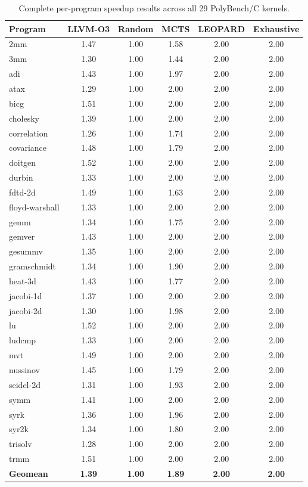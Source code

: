\documentclass{article}
\begin{document}
\begin{table}[h]
\caption{Complete per-program speedup results across all 29 PolyBench/C kernels.}
\label{tab:complete}
\centering
\small
\begin{tabular}{lccccc}
\toprule
\textbf{Program} & \textbf{LLVM-O3} & \textbf{Random} & \textbf{MCTS} & \textbf{LEOPARD} & \textbf{Exhaustive} \\
\midrule
2mm & 1.47 & 1.00 & 1.58 & 2.00 & 2.00 \\
3mm & 1.30 & 1.00 & 1.44 & 2.00 & 2.00 \\
adi & 1.43 & 1.00 & 1.97 & 2.00 & 2.00 \\
atax & 1.29 & 1.00 & 2.00 & 2.00 & 2.00 \\
bicg & 1.51 & 1.00 & 2.00 & 2.00 & 2.00 \\
cholesky & 1.39 & 1.00 & 2.00 & 2.00 & 2.00 \\
correlation & 1.26 & 1.00 & 1.74 & 2.00 & 2.00 \\
covariance & 1.48 & 1.00 & 1.79 & 2.00 & 2.00 \\
doitgen & 1.52 & 1.00 & 2.00 & 2.00 & 2.00 \\
durbin & 1.33 & 1.00 & 2.00 & 2.00 & 2.00 \\
fdtd-2d & 1.49 & 1.00 & 1.63 & 2.00 & 2.00 \\
floyd-warshall & 1.33 & 1.00 & 2.00 & 2.00 & 2.00 \\
gemm & 1.34 & 1.00 & 1.75 & 2.00 & 2.00 \\
gemver & 1.43 & 1.00 & 2.00 & 2.00 & 2.00 \\
gesummv & 1.35 & 1.00 & 2.00 & 2.00 & 2.00 \\
gramschmidt & 1.34 & 1.00 & 1.90 & 2.00 & 2.00 \\
heat-3d & 1.43 & 1.00 & 1.77 & 2.00 & 2.00 \\
jacobi-1d & 1.37 & 1.00 & 2.00 & 2.00 & 2.00 \\
jacobi-2d & 1.30 & 1.00 & 1.98 & 2.00 & 2.00 \\
lu & 1.52 & 1.00 & 2.00 & 2.00 & 2.00 \\
ludcmp & 1.33 & 1.00 & 2.00 & 2.00 & 2.00 \\
mvt & 1.49 & 1.00 & 2.00 & 2.00 & 2.00 \\
nussinov & 1.45 & 1.00 & 1.79 & 2.00 & 2.00 \\
seidel-2d & 1.31 & 1.00 & 1.93 & 2.00 & 2.00 \\
symm & 1.41 & 1.00 & 2.00 & 2.00 & 2.00 \\
syrk & 1.36 & 1.00 & 1.96 & 2.00 & 2.00 \\
syr2k & 1.34 & 1.00 & 1.80 & 2.00 & 2.00 \\
trisolv & 1.28 & 1.00 & 2.00 & 2.00 & 2.00 \\
trmm & 1.51 & 1.00 & 2.00 & 2.00 & 2.00 \\
\midrule
\textbf{Geomean} & \textbf{1.39} & \textbf{1.00} & \textbf{1.89} & \textbf{2.00} & \textbf{2.00} \\
\bottomrule
\end{tabular}
\end{table}
\end{document}
